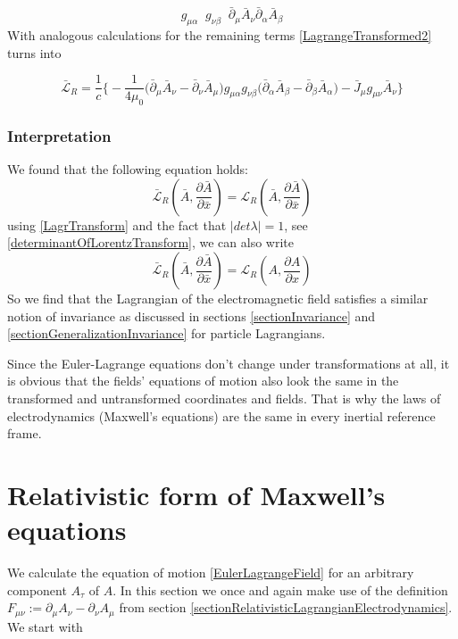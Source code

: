 \documentclass{article}
\begin{document}
\begin{equation}
    g_{\mu\alpha} \;\; g_{\nu\beta} \;\; \bar{\partial}_\mu \bar{A}_\nu \bar{\partial}_\alpha \bar{A}_\beta
\end{equation}
With analogous calculations for the remaining terms \ref{LagrangeTransformed2} turns into

\begin{equation} \label{LagrangeTransformFinal}
    \bar{\mathcal{L}}_R = \frac{1}{c} \bigg\{ -\frac{1}{4\mu_0}
    \big(\bar{\partial}_\mu \bar{A}_\nu - \bar{\partial}_\nu \bar{A}_\mu \big)
    g_{\mu\alpha} g_{\nu\beta}
    \big(\bar{\partial}_\alpha \bar{A}_\beta - \bar{\partial}_\beta \bar{A}_\alpha\big)
    - \bar{J}_\mu g_{\mu\nu} \bar{A}_\nu \bigg\}
\end{equation}

\subsubsection{Interpretation} \label{invarianceMaxwell}

We found that the following equation holds:
\begin{equation}
    \bar{\mathcal{L}}_R(\bar{A}, \frac{\partial \bar{A}}{\partial \bar{x}}) = \mathcal{L}_R(\bar{A}, \frac{\partial \bar{A}}{\partial \bar{x}})
\end{equation}
using \ref{LagrTransform} and the fact that $|det\lambda| = 1$, see \ref{determinantOfLorentzTransform}, we can also write
\begin{equation}
    \bar{\mathcal{L}}_R(\bar{A}, \frac{\partial \bar{A}}{\partial \bar{x}}) = \mathcal{L}_R(A, \frac{\partial A}{\partial x})
\end{equation}
So we find that the Lagrangian of the electromagnetic field satisfies a similar notion of invariance as discussed in sections \ref{sectionInvariance} and \ref{sectionGeneralizationInvariance}
for particle Lagrangians.

Since the Euler-Lagrange equations don't change under transformations at all, it is obvious that the fields' equations of motion also look the same
in the transformed and untransformed coordinates and fields.
That is why the laws of electrodynamics (Maxwell's equations) are the same in every inertial reference frame.


\section{Relativistic form of Maxwell's equations}
We calculate the equation of motion \ref{EulerLagrangeField} for an arbitrary component $A_\tau$ of $A$.
In this section we once and again make use of the definition $F_{\mu\nu} := \partial_\mu A_\nu - \partial_\nu A_\mu$ from section \ref{sectionRelativisticLagrangianElectrodynamics}.
We start with
\end{document}
